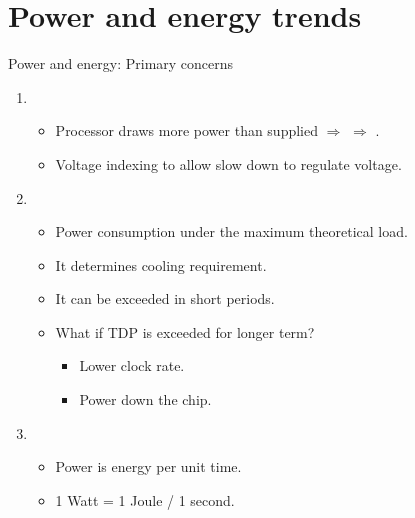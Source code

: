 \section{Power and energy trends}

\begin{frame}[t]{Power and energy: Primary concerns}
\begin{enumerate}
  \item {}
    \begin{itemize}
      \item Processor draws more power than supplied $\Rightarrow$ 
            $\Rightarrow$ .
      \item Voltage indexing to allow slow down to regulate voltage.
    \end{itemize}

  \item {}
    \begin{itemize}
      \item Power consumption under the maximum theoretical load.
      \item It determines cooling requirement.
      \item It can be exceeded in short periods.
      \item What if TDP is exceeded for longer term?
        \begin{itemize}
          \item Lower clock rate.
          \item Power down the chip.
        \end{itemize}
    \end{itemize}   

  \item {}
    \begin{itemize}
      \item Power is energy per unit time.
      \item 1 Watt = 1 Joule / 1 second.
    \end{itemize}
\end{enumerate}
\end{frame}

